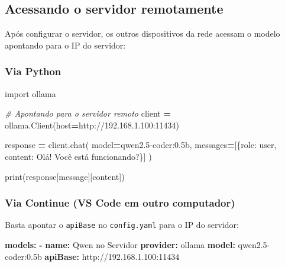 \documentclass[
]{article}
\newenvironment{Shaded}{\begin{snugshade}}{\end{snugshade}}
\newcommand{\AttributeTok}[1]{\textcolor[rgb]{0.13,0.29,0.53}{#1}}
\newcommand{\BuiltInTok}[1]{#1}
\newcommand{\CommentTok}[1]{\textcolor[rgb]{0.56,0.35,0.01}{\textit{#1}}}
\newcommand{\FunctionTok}[1]{\textcolor[rgb]{0.13,0.29,0.53}{\textbf{#1}}}
\newcommand{\ImportTok}[1]{#1}
\newcommand{\KeywordTok}[1]{\textcolor[rgb]{0.13,0.29,0.53}{\textbf{#1}}}
\newcommand{\NormalTok}[1]{#1}
\newcommand{\OperatorTok}[1]{\textcolor[rgb]{0.81,0.36,0.00}{\textbf{#1}}}
\newcommand{\StringTok}[1]{\textcolor[rgb]{0.31,0.60,0.02}{#1}}
\begin{document}
\subsection{Acessando o servidor
remotamente}\label{acessando-o-servidor-remotamente}

Após configurar o servidor, os outros dispositivos da rede acessam o
modelo apontando para o IP do servidor:

\subsubsection{Via Python}\label{via-python}

\begin{Shaded}
\begin{Highlighting}[]
\ImportTok{import}\NormalTok{ ollama}

\CommentTok{\# Apontando para o servidor remoto}
\NormalTok{client }\OperatorTok{=}\NormalTok{ ollama.Client(host}\OperatorTok{=}\StringTok{\textquotesingle{}http://192.168.1.100:11434\textquotesingle{}}\NormalTok{)}

\NormalTok{response }\OperatorTok{=}\NormalTok{ client.chat(}
\NormalTok{    model}\OperatorTok{=}\StringTok{\textquotesingle{}qwen2.5{-}coder:0.5b\textquotesingle{}}\NormalTok{,}
\NormalTok{    messages}\OperatorTok{=}\NormalTok{[\{}\StringTok{\textquotesingle{}role\textquotesingle{}}\NormalTok{: }\StringTok{\textquotesingle{}user\textquotesingle{}}\NormalTok{, }\StringTok{\textquotesingle{}content\textquotesingle{}}\NormalTok{: }\StringTok{\textquotesingle{}Olá! Você está funcionando?\textquotesingle{}}\NormalTok{\}]}
\NormalTok{)}

\BuiltInTok{print}\NormalTok{(response[}\StringTok{\textquotesingle{}message\textquotesingle{}}\NormalTok{][}\StringTok{\textquotesingle{}content\textquotesingle{}}\NormalTok{])}
\end{Highlighting}
\end{Shaded}

\subsubsection{Via Continue (VS Code em outro
computador)}\label{via-continue-vs-code-em-outro-computador}

Basta apontar o \texttt{apiBase} no \texttt{config.yaml} para o IP do
servidor:

\begin{Shaded}
\begin{Highlighting}[]
\FunctionTok{models}\KeywordTok{:}
\AttributeTok{  }\KeywordTok{{-}}\AttributeTok{ }\FunctionTok{name}\KeywordTok{:}\AttributeTok{ Qwen no Servidor}
\AttributeTok{    }\FunctionTok{provider}\KeywordTok{:}\AttributeTok{ ollama}
\AttributeTok{    }\FunctionTok{model}\KeywordTok{:}\AttributeTok{ qwen2.5{-}coder:0.5b}
\AttributeTok{    }\FunctionTok{apiBase}\KeywordTok{:}\AttributeTok{ http://192.168.1.100:11434}
\end{Highlighting}
\end{Shaded}
\end{document}
